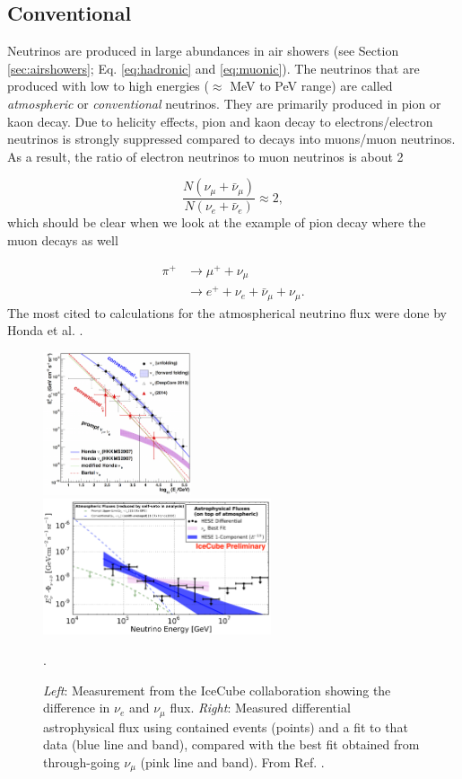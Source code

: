 \subsection{Conventional}
Neutrinos are produced in large abundances in air showers (see Section \ref{sec:airshowers}; Eq. \ref{eq:hadronic} and \ref{eq:muonic}). The neutrinos that are produced with low to high energies ($\approx$ MeV to PeV range) are called \textit{atmospheric} or \textit{conventional} neutrinos. They are primarily produced in pion or kaon decay. Due to helicity effects, pion and kaon decay to electrons/electron neutrinos is strongly suppressed compared to decays into muons/muon neutrinos. As a result, the ratio of electron neutrinos to muon neutrinos is about 2

\begin{equation}
\frac{N\left( \nu_\mu + \bar{\nu}_\mu\right) }{N\left(\nu_e + \bar{\nu}_e\right)} \approx 2,
\end{equation}
which should be clear when we look at the example of pion decay where the muon decays as well

\begin{align}
\pi^+ &\rightarrow \mu^+ + \nu_\mu \nonumber \\
& \rightarrow e^+ + \nu_e + \bar{\nu}_\mu + \nu_\mu.
\end{align}
The most cited to calculations for the atmospherical neutrino flux were done by Honda et al. \cite{Honda:2006qj}.
\begin{figure}[t]
\centering
\includegraphics[width=0.39\textwidth]{chapter3/img/neutrinospectrum2.png}
\includegraphics[width=0.6\textwidth]{chapter3/img/astroflux.png}
\caption{\textit{Left}: Measurement from the IceCube collaboration showing the difference in $\nu_e$ and $\nu_\mu$ flux. \textit{Right}: Measured differential astrophysical flux using contained events (points) and a fit to that data (blue line and band), compared with the best fit obtained from through-going $\nu_\mu$ (pink line and band). From Ref. \cite{Aartsen:2017mau}.}.
\label{fig:neutrinospectrum2}
\end{figure}

